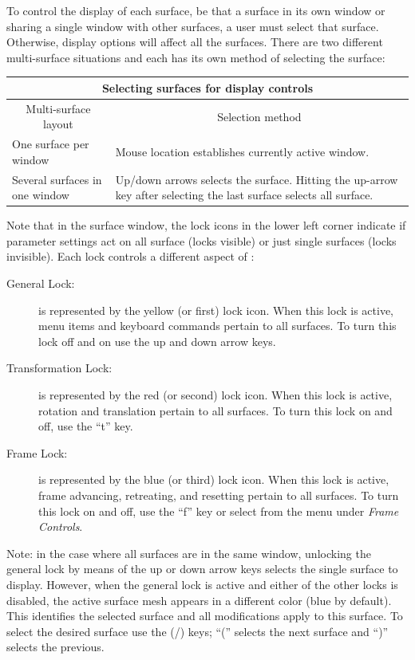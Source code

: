To control the display of each surface, be that a surface in its own window
or sharing a single window with other surfaces, a user must select that
surface.  Otherwise, display options will affect all the surfaces.  There
are two different multi-surface situations and each has its own method of
selecting the surface:
%
\begin{center}
  \begin{tabular}{|l|p{3in}|}\hline
    \multicolumn{2}{|c|}{Selecting surfaces for display controls} \\ \hline
    \multicolumn{1}{|c|}{Multi-surface layout} & 
    \multicolumn{1}{c|}{Selection method} \\ \hline
    One surface per window & Mouse location establishes currently active
    window. \\
    Several surfaces in one window & Up/down arrows selects the surface.
    Hitting 
    the up-arrow key after selecting the last surface selects all surface. \\
    \hline 
  \end{tabular}
\end{center}

Note that in the surface window, the lock icons in the lower left corner
indicate if parameter settings act on all surface (locks visible) or just
single surfaces (locks invisible).  Each lock controls a different aspect of 
\map{}:

\begin{description}
  \item [General Lock:] is represented by the yellow (or first) lock icon.  
        When this lock is active, menu items and keyboard commands pertain 
        to all surfaces.  To turn this lock off and on use the up
        and down arrow keys.
  \item [Transformation Lock: ] is represented by the red (or second) 
        lock icon.  When this lock is active, rotation and translation 
        pertain to all surfaces. To turn this lock on and off, use the
        ``t'' key.
  \item [Frame Lock: ] is represented by the blue (or third) lock icon.
        When this lock is active, frame advancing, retreating, and resetting
        pertain to all surfaces.  To turn this lock on and off, use the
        ``f'' key or select from the menu under \emph{Frame Controls}.
\end{description}

Note: in the case where all surfaces are in the same window, unlocking the
general lock by means of the up or down arrow keys selects the single
surface to display.  However, when the general lock is active and either of
the other locks is disabled, the active surface mesh appears in a different
color (blue by default).  This identifies the selected surface and all
modifications apply to this surface.  To select the desired surface use the
(/) keys; ``('' selects the next surface and ``)'' selects the previous.



